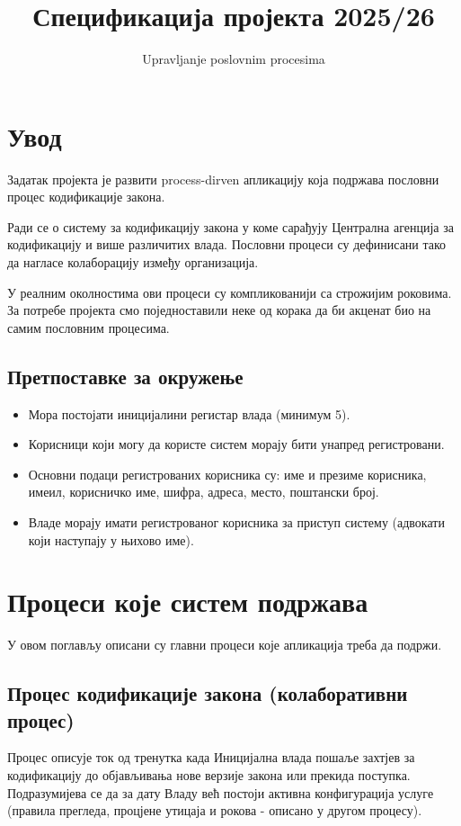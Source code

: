 \documentclass[12pt,a4paper]{article}
\title{\textbf{Спецификација пројекта 2025/26}}
\author{Upravljanje poslovnim procesima}
\date{\vspace{-\baselineskip}}
\begin{document}
\maketitle

\section{Увод}

Задатак пројекта је развити process-dirven апликацију која подржава пословни процес кодификације закона.

Ради се о систему за кодификацију закона у коме сарађују Централна агенција за кодификацију и више различитих влада. Пословни процеси су дефинисани тако да нагласе колаборацију између организација.

У реалним околностима ови процеси су компликованији са строжијим роковима. За потребе пројекта смо поједноставили неке од корака да би акценат био на самим пословним процесима.

\subsection{Претпоставке за окружење}

\begin{itemize}
    \item Мора постојати иницијалини регистар влада (минимум 5).
    \item Корисници који могу да користе систем морају бити унапред регистровани.
    \item Основни подаци регистрованих корисника су: име и презиме корисника, имеил, корисничко име, шифра, адреса, место, поштански број.
    \item Владе морају имати регистрованог корисника за приступ систему (адвокати који наступају у њихово име).
\end{itemize}

\section{Процеси које систем подржава}

У овом поглављу описани су главни процеси које апликација треба да подржи.

\subsection{Процес кодификације закона (колаборативни процес)}

Процес описује ток од тренутка када Иницијална влада пошаље захтјев за кодификацију до објављивања нове верзије закона или прекида поступка. Подразумијева се да за дату Владу већ постоји активна конфигурација услуге (правила прегледа, процјене утицаја и рокова - описано у другом процесу).
\end{document}
